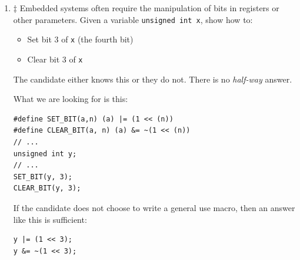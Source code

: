 \documentclass[12pt]{article}
\newcommand{\cvolatile}{{\texttt{volatile}}}%
\begin{document}
\begin{enumerate}
The answer is that it is perfectly fine to use code like
this for the situation where the value that {\texttt{preg}}
points to (a {\texttt{const volatile}} will change
unexpectedly {\textit{and}} be read-only. A perfect situation
for a register value.

\par
So in a nutshell, let us not get wrapped around the axle on what the compiler
does when it encounters the \cvolatile\ keyword.  The take-home message is that
the compiler is being instructed to treat that value as something which will
change unexpectedly.  Even if it doesn't.  The compiler will treat it as it does, and
that means fetching the value from whatever source is done whenever the value is needed.
Yes, the literature will say ``it means that the compiler will not optimize away the
read/write to that variable.''  Yes, but the meaning of what the keyword is is more important.
What a compiler does (a vendor specific issue) is only just partially related to the answer.
\par
So in the example of {\texttt{square()}}, that put a light on the defect where we did not
capture the value once, and use the safe captured value to compute the square.

\item $\ddagger$ Embedded systems often require the manipulation of bits in
registers or other parameters.  Given a variable 
{\texttt{unsigned int x}}, show how to:
  \begin{itemize}
    \item Set bit 3 of {\texttt{x}} (the fourth bit)
    \item Clear bit 3 of {\texttt{x}}
  \end{itemize}

The candidate either knows this or they do not.  There is no
{\textit{half-way}} answer.

What we are looking for is this:

\begin{lstlisting}
#define SET_BIT(a,n) (a) |= (1 << (n))
#define CLEAR_BIT(a, n) (a) &= ~(1 << (n))
// ...
unsigned int y;
// ...
SET_BIT(y, 3);
CLEAR_BIT(y, 3);
\end{lstlisting}

If the candidate does not choose to write a general use macro, then
an answer like this is sufficient:
\begin{lstlisting}
y |= (1 << 3);
y &= ~(1 << 3);
\end{lstlisting}


\end{enumerate}
\end{document}
